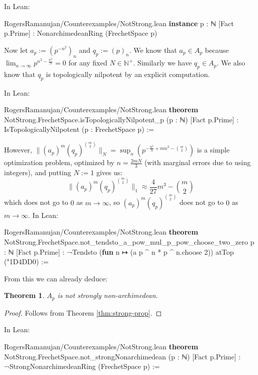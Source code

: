 \documentclass[12pt]{amsart}
\newtheorem{theorem}{Theorem}[subsection]
\theoremstyle{definition}
\theoremstyle{remark}
\numberwithin{equation}{subsection}
\newcommand{\N}{\mathbb N}
\newcommand{\nhds}{{\char"1D4DD}}
\newcommand{\kw}[1]{\textcolor{keywordcolor}{\textbf{#1}}}
\newcommand{\var}[1]{\textcolor{tacticcolor}{#1}}
\newcommand{\prop}[1]{\textcolor{sortcolor}{#1}}
\newcommand{\num}[1]{\textcolor{numcolor}{#1}}
\newcommand{\imp}[1]{\textcolor{commentcolor}{\textbraceleft#1\textbraceright}}
\begin{document}
In Lean:

\begin{code}{RogersRamanujan/Counterexamples/NotStrong.lean}
\kw{instance} \imp{p : ℕ} [Fact \var{p}.\prop{Prime}] : NonarchimedeanRing (FrechetSpace \var{p})
\end{code}

Now let $a_p := (p^{-n^2})_n$ and $q_p := (p)_n$. We know that $a_p \in A_p$ because $\lim_{n \to \infty} p^{n^2 - \frac{n^3}{N}} = 0$ for any fixed $N \in \N^+$. Similarly we have $q_p \in A_p$. We also know that $q_p$ is topologically nilpotent by an explicit computation.

In Lean:

\begin{code}{RogersRamanujan/Counterexamples/NotStrong.lean}
\kw{theorem} NotStrong.FrechetSpace.isTopologicallyNilpotent_p (\var{p} : ℕ) [Fact \var{p}.\prop{Prime}] :
  IsTopologicallyNilpotent (\var{p} : FrechetSpace \var{p}) :=
\end{code}

However, $\|(a_p)^m (q_p)^{\binom{m}{2}}\|_N = \sup_n \left( p^{-\frac{n^3}{N} + mn^2 - \binom{m}{2}} \right)$ is a simple optimization problem, optimized by $n = \frac{2mN}{3}$ (with marginal errors due to using integers), and putting $N := 1$ gives us:
\begin{equation}
    \|(a_p)^m (q_p)^{\binom{m}{2}}\|_1 \approx \frac{4}{27} m^3 - \binom{m}{2}
\end{equation}
which does not go to $0$ as $m \to \infty$, so $(a_p)^m (q_p)^{\binom{m}{2}}$ does not go to $0$ as $m \to \infty$. In Lean:

\begin{code}{RogersRamanujan/Counterexamples/NotStrong.lean}
\kw{theorem} NotStrong.FrechetSpace.not_tendsto_a_pow_mul_p_pow_choose_two_zero \imp{p : ℕ}
  [Fact \var{p}.\prop{Prime}] : ¬Tendsto (\kw{fun} \var{n} ↦ (a \var{p} ^ \var{n} * \var{p} ^ \var{n}.\prop{choose} \num{2})) atTop (\nhds \num{0}) :=
\end{code}

From this we can already deduce:
\begin{theorem}\label{thm:not-strong}
    $A_p$ is not strongly non-archimedean.
\end{theorem}
\begin{proof}
    Follows from Theorem \ref{thm:strong-prop}.
\end{proof}

In Lean:

\begin{code}{RogersRamanujan/Counterexamples/NotStrong.lean}
\kw{theorem} NotStrong.FrechetSpace.not_strongNonarchimedean (\var{p} : ℕ) [Fact \var{p}.\prop{Prime}] :
  ¬StrongNonarchimedeanRing (FrechetSpace \var{p}) :=
\end{code}
\end{document}
